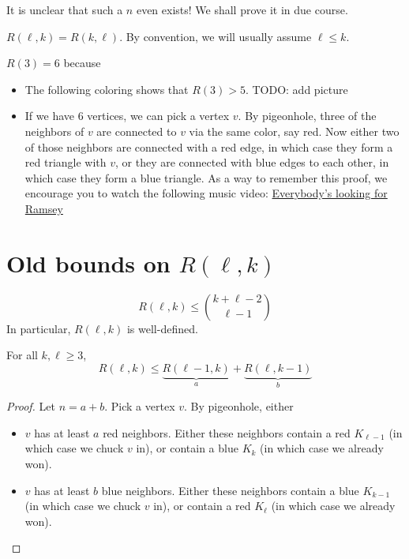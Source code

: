 \documentclass{article}
\begin{document}
It is unclear that such a $n$ even exists! We shall prove it in due course.

$R(\ell, k) = R(k, \ell)$. By convention, we will usually assume $\ell \le k$.

\begin{eg}
  $R(3) = 6$ because
  \begin{itemize}
    \item The following coloring shows that $R(3) > 5$. TODO: add picture
    \item If we have $6$ vertices, we can pick a vertex $v$. By pigeonhole, three of the neighbors of $v$ are connected to $v$ via the same color, say red. Now either two of those neighbors are connected with a red edge, in which case they form a red triangle with $v$, or they are connected with blue edges to each other, in which case they form a blue triangle. As a way to remember this proof, we encourage you to watch the following music video: \href{https://youtu.be/vE7MW2lk55E}{Everybody's looking for Ramsey}
  \end{itemize}
\end{eg}

\section{Old bounds on \texorpdfstring{$R(\ell, k)$}{R(l, k)}}

\begin{thm}
  $$R(\ell, k) \le \binom{k + \ell - 2}{\ell - 1}$$
  In particular, $R(\ell, k)$ is well-defined.
\end{thm}

\begin{lem}
  For all $k, \ell \ge 3$,
  $$R(\ell, k) \le \underbrace{R(\ell - 1, k)}_a + \underbrace{R(\ell, k - 1)}_b$$
\end{lem}
\begin{proof}
  Let $n = a + b$. Pick a vertex $v$. By pigeonhole, either
  \begin{itemize}
    \item $v$ has at least $a$ red neighbors. Either these neighbors contain a red $K_{\ell - 1}$ (in which case we chuck $v$ in), or contain a blue $K_k$ (in which case we already won).
    \item $v$ has at least $b$ blue neighbors. Either these neighbors contain a blue $K_{k - 1}$ (in which case we chuck $v$ in), or contain a red $K_\ell$ (in which case we already won).
  \end{itemize}
\end{proof}
\end{document}
